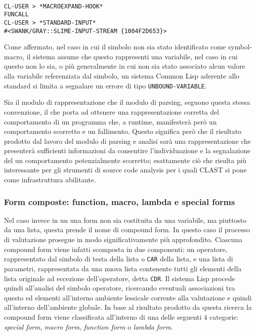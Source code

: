 \begin{lstlisting}[caption=Esempi di form di tipo symbol]

CL-USER > *MACROEXPAND-HOOK*
FUNCALL
CL-USER > *STANDARD-INPUT*
#<SWANK/GRAY::SLIME-INPUT-STREAM {1004F2D653}>

\end{lstlisting}

Come affermato, nel caso in cui il simbolo non sia stato identificato come
symbol-macro, il sistema assume che questo rappresenti una variabile, nel caso
in cui questo non lo sia, o più generalmente in cui non sia stato associato
alcun valore alla variabile referenziata dal simbolo, un sistema Common Lisp
aderente allo standard si limita a segnalare un errore di tipo \texttt
{UNBOUND-VARIABLE}.

Sia il modulo di rappresentazione che il modulo di parsing, seguono questa
stessa convenzione, il che porta ad ottenere una rappresentazione corretta del
comportamento di un programma che, a runtime, manifesterà però un
comportamento scorretto e un fallimento. Questo significa però che il
risultato prodotto dal lavoro del modulo di parsing e analisi sarà una
rappresentazione che presenterà sufficienti informazioni da consentire
l’individuazione e la segnalazione del un comportamento potenzialmente
scorretto; esattamente ciò che risulta più interessante per gli strumenti di
source code analysis per i quali CLAST si pone come infrastruttura
abilitante.\\

\subsubsection{Form composte: function, macro, lambda e special forms}

Nel caso invece in un una form non sia costituita da una variabile, ma
piuttosto da una lista, questa prende il nome di compound form. In questo caso
il processo di valutazione prosegue in modo significativamente più
approfondito. Ciascuna compound form viene infatti scomposta in due
componenti: un operatore, rappresentato dal simbolo di testa della lista o
\texttt{CAR} della lista, e una lista di parametri, rappresentata da una nuova
lista contenente tutti gli elementi della lista originale ad eccezione
dell’operatore, detta \texttt{CDR}. Il sistema Lisp procede quindi all'analisi
del simbolo operatore, ricercando eventuali associazioni tra questo ed
elementi all’interno ambiente lessicale corrente alla valutazione e quindi
all'interno dell'ambiente globale. In base al risultato prodotto da questa
ricerca la compound form viene classificata all’interno di una delle seguenti
4 categorie: \textit{special form}, \textit{macro form}, \textit
{function form} o \textit{lambda form}.

